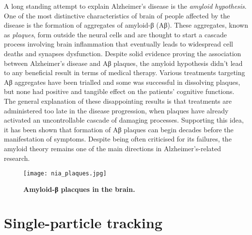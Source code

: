 A long standing attempt to explain Alzheimer’s disease is the \emph{amyloid hypothesis}. One of the most distinctive characteristics of brain of people affected by the disease is the formation of aggregates of amyloid-β (Aβ). These aggregates, known as \emph{plaques}, form outside the neural cells and are thought to start a cascade process involving brain inflammation that eventually leads to widespread cell deaths and synapses dysfunction. Despite solid evidence proving the association between Alzheimer's disease and Aβ plaques, the amyloid hypothesis didn't lead to any beneficial result in terms of medical therapy. Various treatments targeting Aβ aggregates have been trialled and some was successful in dissolving plaques, but none had positive and tangible effect on the patients' cognitive functions. The general explanation of these disappointing results is that treatments are administered too late in the disease progression, when plaques have already activated an uncontrollable cascade of damaging processes. Supporting this idea, it has been shown that formation of Aβ plaques can begin decades before the manifestation of symptoms. Despite being often criticised for its failures, the amyloid theory remains one of the main directions in Alzheimer's-related research.

\begin{figure}
  \texttt{[image: nia\_plaques.jpg]}
  \caption{\textbf{Amyloid-β placques in the brain.} }
\end{figure}


\section{Single-particle tracking}
